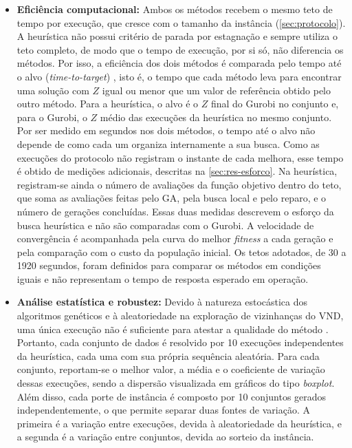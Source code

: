 \begin{itemize}
    \item \textbf{Eficiência computacional:} Ambos os métodos recebem o mesmo teto de tempo por execução, que cresce com o tamanho da instância (\autoref{sec:protocolo}). A heurística não possui critério de parada por estagnação e sempre utiliza o teto completo, de modo que o tempo de execução, por si só, não diferencia os métodos. Por isso, a eficiência dos dois métodos é comparada pelo tempo até o alvo (\textit{time-to-target}) \cite{aiex2007ttt}, isto é, o tempo que cada método leva para encontrar uma solução com $Z$ igual ou menor que um valor de referência obtido pelo outro método. Para a heurística, o alvo é o $Z$ final do Gurobi no conjunto e, para o Gurobi, o $Z$ médio das execuções da heurística no mesmo conjunto. Por ser medido em segundos nos dois métodos, o tempo até o alvo não depende de como cada um organiza internamente a sua busca. Como as execuções do protocolo não registram o instante de cada melhora, esse tempo é obtido de medições adicionais, descritas na \autoref{sec:res-esforco}. Na heurística, registram-se ainda o número de avaliações da função objetivo dentro do teto, que soma as avaliações feitas pelo GA, pela busca local e pelo reparo, e o número de gerações concluídas. Essas duas medidas descrevem o esforço da busca heurística e não são comparadas com o Gurobi. A velocidade de convergência é acompanhada pela curva do melhor \textit{fitness} a cada geração e pela comparação com o custo da população inicial. Os tetos adotados, de 30 a 1920 segundos, foram definidos para comparar os métodos em condições iguais e não representam o tempo de resposta esperado em operação.

    
    \item \textbf{Análise estatística e robustez:} Devido à natureza estocástica dos algoritmos genéticos e à aleatoriedade na exploração de vizinhanças do VND, uma única execução não é suficiente para atestar a qualidade do método \cite{talbi2009metaheuristics}. Portanto, cada conjunto de dados é resolvido por 10 execuções independentes da heurística, cada uma com sua própria sequência aleatória. Para cada conjunto, reportam-se o melhor valor, a média e o coeficiente de variação dessas execuções, sendo a dispersão visualizada em gráficos do tipo \textit{boxplot}. Além disso, cada porte de instância é composto por 10 conjuntos gerados independentemente, o que permite separar duas fontes de variação. A primeira é a variação entre execuções, devida à aleatoriedade da heurística, e a segunda é a variação entre conjuntos, devida ao sorteio da instância.
    
\end{itemize}



